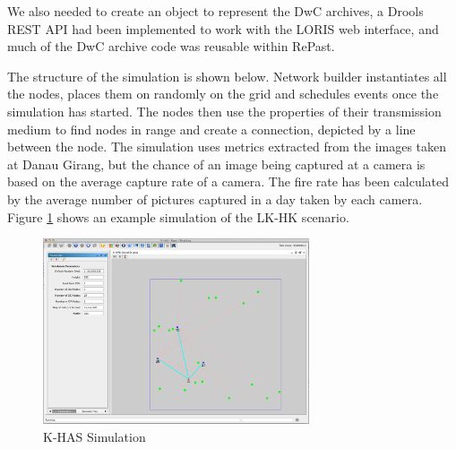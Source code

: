 We also needed to create an object to represent the DwC archives, a Drools REST API had been implemented to work with the LORIS web interface, and much of the DwC archive code was reusable within RePast. 

The structure of the simulation is shown below. Network builder instantiates all the nodes, places them on randomly on the grid and schedules events once the simulation has started. The nodes then use the properties of their transmission medium to find nodes in range and create a connection, depicted by a line between the node. The simulation uses metrics extracted from the images taken at Danau Girang, but the chance of an image being captured at a camera is based on the average capture rate of a camera. The fire rate has been calculated by the average number of pictures captured in a day taken by each camera. Figure \ref{fig:sim} shows an example simulation of the LK-HK scenario.


	\begin{figure}[h]
	\centering
	\includegraphics[width=0.70\textwidth]{Chap7/figures/khas_sim}
	\caption{K-HAS Simulation}
	\label{fig:sim}
	\end{figure}




